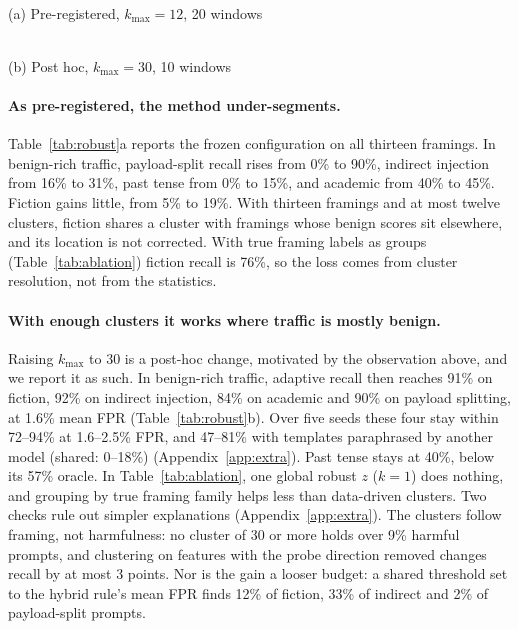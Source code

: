\documentclass[11pt]{article}
\begin{document}
\begin{table}[t]
\centering
\begin{minipage}{0.49\textwidth}\centering
\resizebox{\textwidth}{!}{}\\[2pt]
{\small (a) Pre-registered, $k_{\max}{=}12$, 20 windows}
\end{minipage}\hfill
\begin{minipage}{0.49\textwidth}\centering
\resizebox{\textwidth}{!}{}\\[2pt]
{\small (b) Post hoc, $k_{\max}{=}30$, 10 windows}
\end{minipage}
\caption{Recall (\%) on harmful test prompts of half B, mean over windows; last row: benign FPR averaged over the 13 framings. Thirteen framings share each traffic window. \emph{Shared}: fixed threshold. \emph{Adaptive}: cluster-wise robust $z$ alone. \emph{Hybrid}: either fires (each at half the budget).}
\label{tab:robust}
\end{table}

\paragraph{As pre-registered, the method under-segments.}
Table~\ref{tab:robust}a reports the frozen configuration on all thirteen framings. In benign-rich traffic, payload-split recall rises from 0\% to 90\%, indirect injection from 16\% to 31\%, past tense from 0\% to 15\%, and academic from 40\% to 45\%. Fiction gains little, from 5\% to 19\%. With thirteen framings and at most twelve clusters, fiction shares a cluster with framings whose benign scores sit elsewhere, and its location is not corrected. With true framing labels as groups (Table~\ref{tab:ablation}) fiction recall is 76\%, so the loss comes from cluster resolution, not from the statistics.

\paragraph{With enough clusters it works where traffic is mostly benign.}
Raising $k_{\max}$ to 30 is a post-hoc change, motivated by the observation above, and we report it as such. In benign-rich traffic, adaptive recall then reaches 91\% on fiction, 92\% on indirect injection, 84\% on academic and 90\% on payload splitting, at 1.6\% mean FPR (Table~\ref{tab:robust}b). Over five seeds these four stay within 72--94\% at 1.6--2.5\% FPR, and 47--81\% with templates paraphrased by another model (shared: 0--18\%) (Appendix~\ref{app:extra}). Past tense stays at 40\%, below its 57\% oracle. In Table~\ref{tab:ablation}, one global robust $z$ ($k{=}1$) does nothing, and grouping by true framing family helps less than data-driven clusters. Two checks rule out simpler explanations (Appendix~\ref{app:extra}). The clusters follow framing, not harmfulness: no cluster of 30 or more holds over 9\% harmful prompts, and clustering on features with the probe direction removed changes recall by at most 3 points. Nor is the gain a looser budget: a shared threshold set to the hybrid rule's mean FPR finds 12\% of fiction, 33\% of indirect and 2\% of payload-split prompts.
\end{document}
